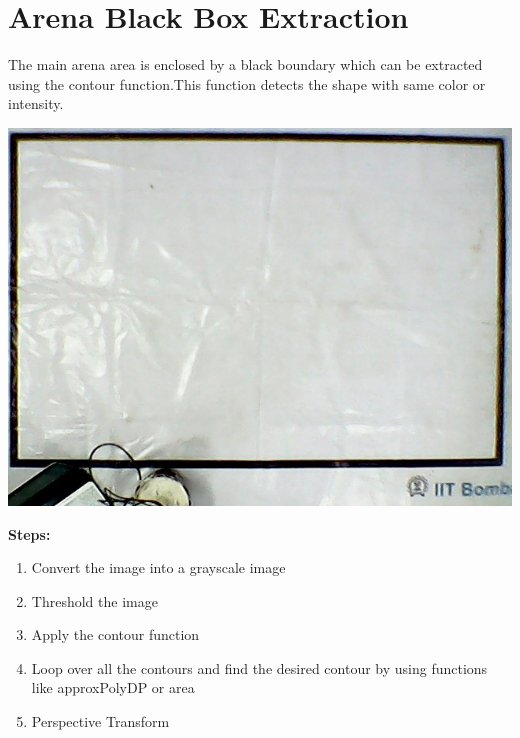 \documentclass[main.tex]{subfiles}
\begin{document}
\section{Arena Black Box Extraction}
The main arena area is enclosed by a black boundary which can be extracted using the contour function.This function detects the shape with same color or intensity.

\begin{center}
	\includegraphics[scale=.6]{images/arena.jpg}
\end{center} 

\textbf{Steps:}
\begin{enumerate}
\item Convert the image into a grayscale image
\item Threshold the image
\item Apply the contour function
\item Loop over all the contours and find the desired contour by using functions like approxPolyDP or area
\item Perspective Transform
\end{enumerate}
\end{document}
